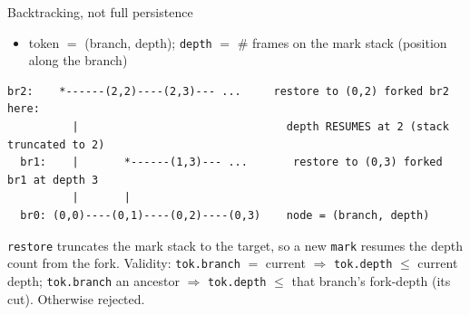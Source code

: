 \documentclass[aspectratio=169,10pt]{beamer}
\newcommand{\code}[1]{\texttt{\small #1}}
\begin{document}
\begin{frame}[fragile]{Backtracking, not full persistence}
\begin{itemize}\small
  \item token $=$ \alert{(branch, depth)}; \code{depth} $=$ \alert{\# frames on the mark stack} (position along the branch)
\end{itemize}
\vspace{1mm}
\begin{lstlisting}[basicstyle=\ttfamily\scriptsize]
  br2:    *------(2,2)----(2,3)--- ...     restore to (0,2) forked br2 here:
          |                                depth RESUMES at 2 (stack truncated to 2)
  br1:    |       *------(1,3)--- ...       restore to (0,3) forked br1 at depth 3
          |       |
  br0: (0,0)----(0,1)----(0,2)----(0,3)    node = (branch, depth)
\end{lstlisting}
\vspace{1mm}
\footnotesize
\code{restore} truncates the mark stack to the target, so a new \code{mark} \alert{resumes the depth count from the fork}. Validity: \code{tok.branch} $=$ current $\Rightarrow$ \code{tok.depth} $\le$ current depth; \code{tok.branch} an \alert{ancestor} $\Rightarrow$ \code{tok.depth} $\le$ that branch's \alert{fork-depth} (its cut). Otherwise \alert{rejected}.
\end{frame}
\end{document}
